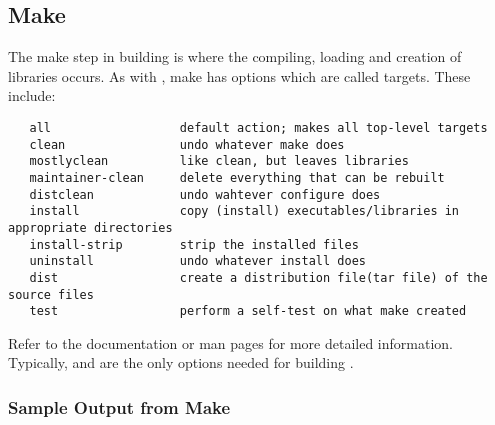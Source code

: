 \subsection{Make}
\label{Make}

The make step in building \hypre{} is where the compiling, loading and creation 
of libraries occurs.  As with , make has options which are called
targets.  These include:
\begin{verbatim}
   all                  default action; makes all top-level targets
   clean                undo whatever make does
   mostlyclean          like clean, but leaves libraries
   maintainer-clean     delete everything that can be rebuilt
   distclean            undo wahtever configure does
   install              copy (install) executables/libraries in appropriate directories
   install-strip        strip the installed files
   uninstall            undo whatever install does
   dist                 create a distribution file(tar file) of the source files
   test                 perform a self-test on what make created
\end{verbatim}

Refer to the  documentation or man pages for more detailed information. 
Typically,  and  are the only options needed for building \hypre{}.

\subsubsection{Sample Output from Make}
\label{Sample Output from Make}


